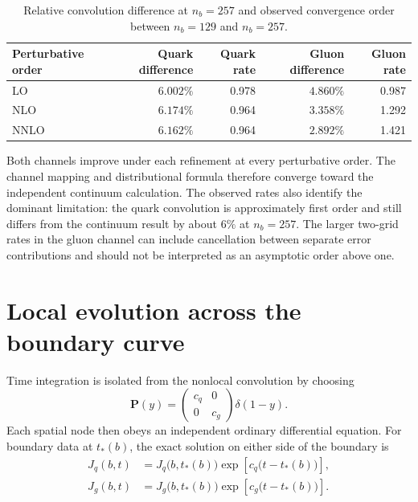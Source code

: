 \documentclass[11pt]{article}
\newcommand{\Pmat}{\bm P}
\begin{document}
\begin{table}[H]
\centering
\caption{Relative convolution difference at \(n_b=257\) and observed
convergence order between \(n_b=129\) and \(n_b=257\).}
\label{tab:physical-convolution}
\begin{tabular}{lrrrr}
\toprule
Perturbative order
  & Quark difference & Quark rate
  & Gluon difference & Gluon rate\\
\midrule
LO & \(6.002\%\) & 0.978 & \(4.860\%\) & 0.987\\
NLO & \(6.174\%\) & 0.964 & \(3.358\%\) & 1.292\\
NNLO & \(6.162\%\) & 0.964 & \(2.892\%\) & 1.421\\
\bottomrule
\end{tabular}
\end{table}

Both channels improve under each refinement at every perturbative order.
The channel mapping and distributional formula therefore converge toward
the independent continuum calculation. The observed rates also identify the
dominant limitation: the quark convolution is approximately first order and
  still differs from the continuum result by about \(6\%\) at \(n_b=257\).
The larger two-grid rates in the gluon channel can include cancellation
between separate error contributions and should not be interpreted as an
asymptotic order above one.

\section{Local evolution across the boundary curve}

Time integration is isolated from the nonlocal convolution by choosing
\begin{equation}
  \Pmat(y)=
  \begin{pmatrix}
    c_q & 0\\
    0 & c_g
  \end{pmatrix}
  \delta(1-y).
  \label{eq:local-kernel}
\end{equation}
Each spatial node then obeys an independent ordinary differential equation.
For boundary data at \(t_*(b)\), the exact solution on either side of the
boundary is
\begin{align}
  J_q(b,t)
  &=J_q\bigl(b,t_*(b)\bigr)
    \exp\left[c_q\bigl(t-t_*(b)\bigr)\right],\\
  J_g(b,t)
  &=J_g\bigl(b,t_*(b)\bigr)
    \exp\left[c_g\bigl(t-t_*(b)\bigr)\right].
\end{align}
\end{document}
